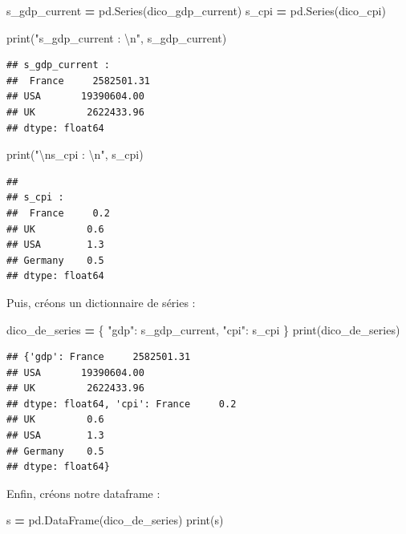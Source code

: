 \documentclass[12pt,]{book}
\newenvironment{Shaded}{\begin{snugshade}}{\end{snugshade}}
\newcommand{\CharTok}[1]{\textcolor[rgb]{0.31,0.60,0.02}{#1}}
\newcommand{\StringTok}[1]{\textcolor[rgb]{0.31,0.60,0.02}{#1}}
\newcommand{\OperatorTok}[1]{\textcolor[rgb]{0.81,0.36,0.00}{\textbf{#1}}}
\newcommand{\BuiltInTok}[1]{#1}
\newcommand{\NormalTok}[1]{#1}
\numberwithin{equation}{section}
\numberwithin{countremarque}{section}
\begin{document}
\begin{Shaded}
\begin{Highlighting}[]
\NormalTok{s_gdp_current }\OperatorTok{=}\NormalTok{ pd.Series(dico_gdp_current)}
\NormalTok{s_cpi }\OperatorTok{=}\NormalTok{ pd.Series(dico_cpi)}

\BuiltInTok{print}\NormalTok{(}\StringTok{"s_gdp_current : }\CharTok{\textbackslash{}n}\StringTok{"}\NormalTok{, s_gdp_current)}
\end{Highlighting}
\end{Shaded}

\begin{lstlisting}
## s_gdp_current : 
##  France     2582501.31
## USA       19390604.00
## UK         2622433.96
## dtype: float64
\end{lstlisting}

\begin{Shaded}
\begin{Highlighting}[]
\BuiltInTok{print}\NormalTok{(}\StringTok{"}\CharTok{\textbackslash{}n}\StringTok{s_cpi : }\CharTok{\textbackslash{}n}\StringTok{"}\NormalTok{, s_cpi)}
\end{Highlighting}
\end{Shaded}

\begin{lstlisting}
## 
## s_cpi : 
##  France     0.2
## UK         0.6
## USA        1.3
## Germany    0.5
## dtype: float64
\end{lstlisting}

Puis, créons un dictionnaire de séries :

\begin{Shaded}
\begin{Highlighting}[]
\NormalTok{dico_de_series }\OperatorTok{=}\NormalTok{ \{}
    \StringTok{"gdp"}\NormalTok{: s_gdp_current,}
    \StringTok{"cpi"}\NormalTok{: s_cpi}
\NormalTok{\}}
\BuiltInTok{print}\NormalTok{(dico_de_series)}
\end{Highlighting}
\end{Shaded}

\begin{lstlisting}
## {'gdp': France     2582501.31
## USA       19390604.00
## UK         2622433.96
## dtype: float64, 'cpi': France     0.2
## UK         0.6
## USA        1.3
## Germany    0.5
## dtype: float64}
\end{lstlisting}

Enfin, créons notre dataframe :

\begin{Shaded}
\begin{Highlighting}[]
\NormalTok{s }\OperatorTok{=}\NormalTok{ pd.DataFrame(dico_de_series)}
\BuiltInTok{print}\NormalTok{(s)}
\end{Highlighting}
\end{Shaded}
\end{document}
